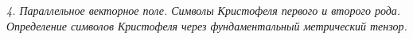 \emph{4. Параллельное векторное поле. Символы Кристофеля первого и второго
рода. Определение символов Кристофеля через фундаментальный метрический тензор.}

\newpage
